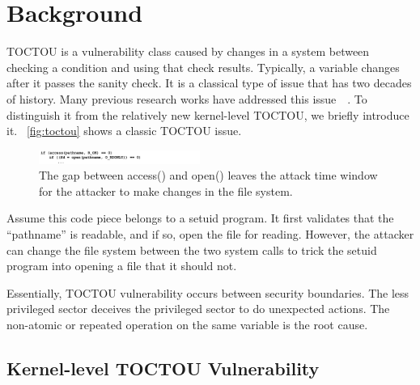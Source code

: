 
\section{Background}
\label{sec:background}


TOCTOU is a vulnerability class caused by changes in a system between checking a condition and using that check results. Typically, a variable changes after it passes the sanity check. It is a classical type of issue that has two decades of history. Many previous research works have addressed this issue~\cite{dean2004fixing}~\cite{borisov2005fixing}. To distinguish it from the relatively new kernel-level TOCTOU, we briefly introduce it. ~\autoref{fig:toctou} shows a classic TOCTOU issue.
\begin{figure}[th]
	\includegraphics[width=0.47\textwidth]{figures/toctou}
	\centering
	\caption{The gap between access() and open() leaves the attack time window for the attacker to make changes in the file system.}
	\label{fig:toctou}
\end{figure}




Assume this code piece belongs to a setuid program. It first validates that the ``pathname'' is readable, and if so, open the file for reading. However, the attacker can change the file system between the two system calls to trick the setuid program into opening a file that it should not.

Essentially, TOCTOU vulnerability occurs between security boundaries. The less privileged sector deceives the privileged sector to do unexpected actions. The non-atomic or repeated operation on the same variable is the root cause.


\subsection{Kernel-level TOCTOU Vulnerability}


